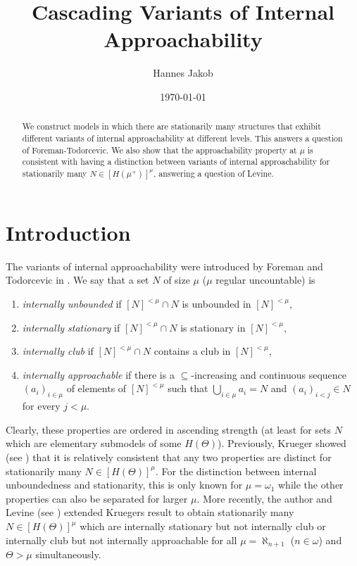 \documentclass[a4paper]{amsart}
\title{Cascading Variants of Internal Approachability} %
\author{Hannes Jakob} %
\date{\today}
\theoremstyle{definition}
\theoremstyle{remark}
\theoremstyle{plain}
\numberwithin{mydef}{section}
\begin{document}
	
	
	
	
	\begin{abstract}
		We construct models in which there are stationarily many structures that exhibit different variants of internal approachability at different levels. This answers a question of Foreman-Todorcevic. We also show that the approachability property at $\mu$ is consistent with having a distinction between variants of internal approachability for stationarily many $N\in[H(\mu^+)]^{\mu}$, answering a question of Levine.
	\end{abstract}
	
	\maketitle
	
	\section*{Introduction}
	
	The variants of internal approachability were introduced by Foreman and Todorcevic in \cite{ForemanTodorLowenheimSkolem}. We say that a set $N$ of size $\mu$ ($\mu$ regular uncountable) is
	\begin{enumerate}
		\item \emph{internally unbounded} if $[N]^{<\mu}\cap N$ is unbounded in $[N]^{<\mu}$,
		\item \emph{internally stationary} if $[N]^{<\mu}\cap N$ is stationary in $[N]^{<\mu}$,
		\item \emph{internally club} if $[N]^{<\mu}\cap N$ contains a club in $[N]^{<\mu}$,
		\item \emph{internally approachable} if there is a $\subseteq$-increasing and continuous sequence $(a_i)_{i\in\mu}$ of elements of $[N]^{<\mu}$ such that $\bigcup_{i\in\mu}a_i=N$ and $(a_i)_{i<j}\in N$ for every $j<\mu$.
	\end{enumerate}
	
	Clearly, these properties are ordered in ascending strength (at least for sets $N$ which are elementary submodels of some $H(\Theta)$). Previously, Krueger showed (see  \cite{KruegerIntApproachAndRefl, KruegerIntClubApproachLarge, KruegerApplicMSI}) that it is relatively consistent that any two properties are distinct for stationarily many $N\in[H(\Theta)]^{\mu}$. For the distinction between internal unboundedness and stationarity, this is only known for $\mu=\omega_1$ while the other properties can also be separated for larger $\mu$. More recently, the author and Levine (see \cite{JakobDisjointInterval, JakobLevineICIAInterval, LevineDisjointStatSeq}) extended Kruegers result to obtain stationarily many $N\in[H(\Theta)]^{\mu}$ which are internally stationary but not internally club or internally club but not internally approachable for all $\mu=\aleph_{n+1}$ ($n\in\omega$) and $\Theta>\mu$ simultaneously.
	
\end{document}
